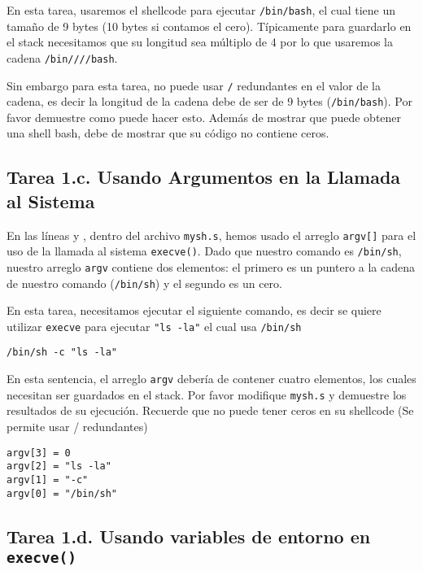 En esta tarea, usaremos el shellcode para ejecutar \texttt{/bin/bash}, el cual tiene un tamaño de 9 bytes (10 bytes si contamos el cero). Típicamente para guardarlo en el stack necesitamos que su longitud sea múltiplo de 4 por lo que usaremos la cadena \texttt{/bin////bash}.

Sin embargo para esta tarea, no puede usar \texttt{/} redundantes en el valor de la cadena, es decir la longitud de la cadena debe de ser de 9 bytes (\texttt{/bin/bash}).
Por favor demuestre como puede hacer esto.
Además de mostrar que puede obtener una shell bash, debe de mostrar que su código no contiene ceros.

\subsection{Tarea 1.c. Usando Argumentos en la Llamada al Sistema}
 
En las líneas  y , dentro del archivo \texttt{mysh.s}, hemos usado el arreglo  \texttt{argv[]} para el uso de la llamada al sistema \texttt{execve()}. Dado que nuestro comando es \texttt{/bin/sh}, nuestro arreglo \texttt{argv} contiene dos elementos: el primero es un puntero a la cadena de nuestro comando (\texttt{/bin/sh}) y el segundo es un cero.

En esta tarea, necesitamos ejecutar el siguiente comando, es decir se quiere utilizar \texttt{execve} para ejecutar \texttt{"ls -la"} el cual usa \texttt{/bin/sh}

\begin{lstlisting}
/bin/sh -c "ls -la"
\end{lstlisting}

En esta sentencia, el arreglo \texttt{argv} debería de contener cuatro elementos, los cuales necesitan ser guardados en el stack. Por favor modifique \texttt{mysh.s} y demuestre los resultados de su ejecución. Recuerde que no puede tener ceros en su shellcode (Se permite usar / redundantes)

\begin{lstlisting}
argv[3] = 0
argv[2] = "ls -la"
argv[1] = "-c"
argv[0] = "/bin/sh"
\end{lstlisting}
 


\subsection{Tarea 1.d. Usando variables de entorno en \texttt{execve()}}

